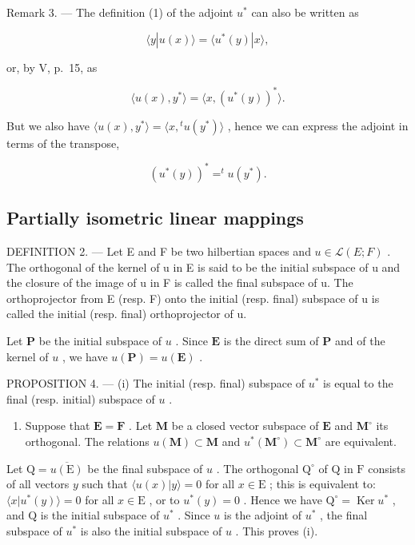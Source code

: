 Remark 3. --- The definition (1) of the adjoint \(u^{*}\) can also be written as

\[
\langle y | u (x) \rangle = \langle u ^ {*} (y) | x \rangle ,
\]

or, by V, p.~15, as

\[
\langle u (x), y ^ {*} \rangle = \langle x, (u ^ {*} (y)) ^ {*} \rangle .
\]

But we also have \(\langle u(x), y^* \rangle = \langle x, {}^t u(y^*) \rangle\) , hence we can express the adjoint in terms of the transpose,

\[
(u ^ {*} (y)) ^ {*} = ^ {t} u (y ^ {*}).
\]

\subsection{Partially isometric linear mappings}

DEFINITION 2. --- Let E and F be two hilbertian spaces and \(u \in \mathcal{L}(E; F)\) . The orthogonal of the kernel of u in E is said to be the initial subspace of u and the closure of the image of u in F is called the final subspace of u. The orthoprojector from E (resp. F) onto the initial (resp. final) subspace of u is called the initial (resp. final) orthoprojector of u.

Let \(\mathbf{P}\) be the initial subspace of \(u\) . Since \(\mathbf{E}\) is the direct sum of \(\mathbf{P}\) and of the kernel of \(u\) , we have \(u(\mathbf{P}) = u(\mathbf{E})\) .

PROPOSITION 4. --- (i) The initial (resp. final) subspace of \(u^*\) is equal to the final (resp. initial) subspace of \(u\) .

\begin{enumerate}
\def\labelenumi{(\roman{enumi})}
\setcounter{enumi}{1}
\tightlist
\item
  Suppose that \(\mathbf{E} = \mathbf{F}\) . Let \(\mathbf{M}\) be a closed vector subspace of \(\mathbf{E}\) and \(\mathbf{M}^{\circ}\) its orthogonal. The relations \(u(\mathbf{M}) \subset \mathbf{M}\) and \(u^{*}(\mathbf{M}^{\circ}) \subset \mathbf{M}^{\circ}\) are equivalent.
\end{enumerate}

Let \(\mathrm{Q} = \overline{u(\mathrm{E})}\) be the final subspace of \(u\) . The orthogonal \(\mathrm{Q}^{\circ}\) of \(\mathrm{Q}\) in \(\mathrm{F}\) consists of all vectors \(y\) such that \(\langle u(x)|y\rangle = 0\) for all \(x\in \mathrm{E}\) ; this is equivalent to: \(\langle x|u^{*}(y)\rangle = 0\) for all \(x\in \mathrm{E}\) , or to \(u^{*}(y) = 0\) . Hence we have \(\mathrm{Q}^{\circ} = \operatorname{Ker}u^{*}\) , and \(\mathrm{Q}\) is the initial subspace of \(u^{*}\) . Since \(u\) is the adjoint of \(u^{*}\) , the final subspace of \(u^{*}\) is also the initial subspace of \(u\) . This proves (i).


